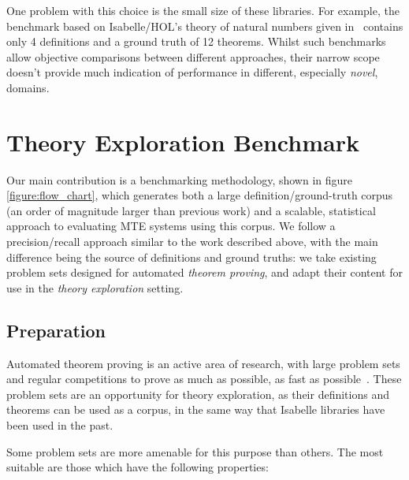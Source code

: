 One problem with this choice is the small size of these libraries. For example,
the benchmark based on Isabelle/HOL's theory of natural numbers given
in~\cite{Johansson.Dixon.Bundy:conjecture-generation} contains only 4
definitions and a ground truth of 12 theorems. Whilst such benchmarks allow
objective comparisons between different approaches, their narrow scope doesn't
provide much indication of performance in different, especially \emph{novel},
domains.

\section{Theory Exploration Benchmark}
\label{sec:proposal}

Our main contribution is a benchmarking methodology, shown in figure
\ref{figure:flow_chart}, which generates both a large definition/ground-truth
corpus (an order of magnitude larger than previous work) and a scalable,
statistical approach to evaluating MTE systems using this corpus. We follow a
precision/recall approach similar to the work described above, with the main
difference being the source of definitions and ground truths: we take existing
problem sets designed for automated \emph{theorem proving}, and adapt their
content for use in the \emph{theory exploration} setting.

\subsection{Preparation}
\label{section:prep}

Automated theorem proving is an active area of research, with large problem sets
and regular competitions to prove as much as possible, as fast as
possible~\cite{pelletier2002development}. These problem sets are an opportunity
for theory exploration, as their definitions and theorems can be used as a
corpus, in the same way that Isabelle libraries have been used in the past.

Some problem sets are more amenable for this purpose than others. The most
suitable are those which have the following properties:

